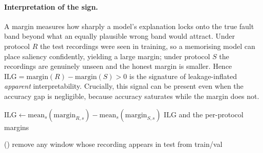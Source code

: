 \documentclass[11pt]{article}
\begin{document}
\paragraph{Interpretation of the sign.}
A margin measures how sharply a model's explanation locks onto the true fault band beyond
what an equally plausible wrong band would attract. Under protocol $R$ the test recordings
were seen in training, so a memorising model can place saliency confidently, yielding a
large margin; under protocol $S$ the recordings are genuinely unseen and the honest margin
is smaller. Hence $\mathrm{ILG}=\text{margin}(R)-\text{margin}(S)>0$ is the signature of
leakage-inflated \emph{apparent} interpretability. Crucially, this signal can be present
even when the accuracy gap is negligible, because accuracy saturates while the margin does
not.

\begin{algorithm}[H]
\caption{Interpretability Leakage Gap (ILG)}
\label{alg:ilg}
$\mathrm{ILG} \leftarrow \mathrm{mean}_s(\text{margin}_{R,s}) - \mathrm{mean}_s(\text{margin}_{S,s})$\;
\Return $\mathrm{ILG}$ and the per-protocol margins\;
\end{algorithm}

\begin{algorithm}[H]
\caption{Split protocols R and S}
\label{alg:split}
\Else(){
  remove any window whose recording appears in test from train/val 
}
\end{algorithm}
\end{document}
